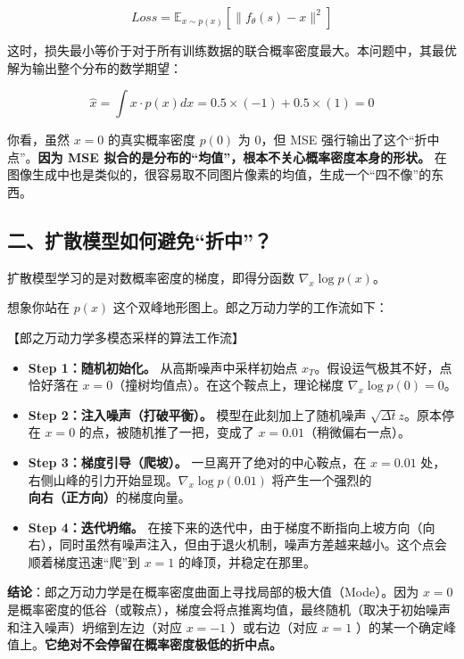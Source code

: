 \[
Loss=\mathbb{E}_{x\sim p(x)}\left[\lVert f_\theta(s)-x\rVert^2\right]
\]

这时，损失最小等价于对于所有训练数据的联合概率密度最大。本问题中，其最优解为输出整个分布的数学期望：

\[
\hat{x}=\int x\cdot p(x)dx=0.5\times(-1)+0.5\times(1)=0
\]

你看，虽然 \(x=0\) 的真实概率密度 \(p(0)\) 为 0，但 MSE 强行输出了这个``折中点''。\textbf{因为 MSE 拟合的是分布的``均值''，根本不关心概率密度本身的形状。}
在图像生成中也是类似的，很容易取不同图片像素的均值，生成一个``四不像''的东西。

\hypertarget{ux4e8cux6269ux6563ux6a21ux578bux5982ux4f55ux907fux514dux6298ux4e2d}{%
\subsection{二、扩散模型如何避免``折中''？}\label{ux4e8cux6269ux6563ux6a21ux578bux5982ux4f55ux907fux514dux6298ux4e2d}}

扩散模型学习的是对数概率密度的梯度，即得分函数 \(\nabla_x\log p(x)\)。

想象你站在 \(p(x)\) 这个双峰地形图上。郎之万动力学的工作流如下：

【郎之万动力学多模态采样的算法工作流】

\begin{itemize}
\tightlist
\item
  \textbf{Step 1：随机初始化。} 从高斯噪声中采样初始点 \(x_T\)。假设运气极其不好，点恰好落在 \(x=0\)（撞树均值点）。在这个鞍点上，理论梯度 \(\nabla_x\log p(0)=0\)。
\item
  \textbf{Step 2：注入噪声（打破平衡）。} 模型在此刻加上了随机噪声 \(\sqrt{\Delta t}z\)。原本停在 \(x=0\) 的点，被随机推了一把，变成了 \(x=0.01\)（稍微偏右一点）。
\item
  \textbf{Step 3：梯度引导（爬坡）。} 一旦离开了绝对的中心鞍点，在 \(x=0.01\) 处，右侧山峰的引力开始显现。\(\nabla_x\log p(0.01)\) 将产生一个强烈的\textbf{向右（正方向）}的梯度向量。
\item
  \textbf{Step 4：迭代坍缩。} 在接下来的迭代中，由于梯度不断指向上坡方向（向右），同时虽然有噪声注入，但由于退火机制，噪声方差越来越小。这个点会顺着梯度迅速``爬''到 \(x=1\) 的峰顶，并稳定在那里。
\end{itemize}

\textbf{结论}：郎之万动力学是在概率密度曲面上寻找局部的极大值（Mode）。因为 \(x=0\) 是概率密度的低谷（或鞍点），梯度会将点推离均值，最终随机（取决于初始噪声和注入噪声）坍缩到左边（对应 \(x=-1\) ）或右边（对应 \(x=1\) ）的某一个确定峰值上。\textbf{它绝对不会停留在概率密度极低的折中点。}

